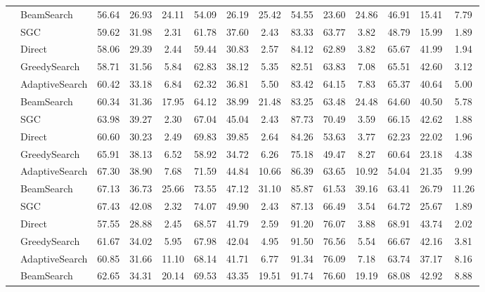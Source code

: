 \documentclass[11pt,UTF8,fontset=fandol]{ctexart}
\begin{document}
\begin{table}[H]
\begin{tabular}{llccc ccc ccc ccc}
& BeamSearch & 56.64 & 26.93 & 24.11 & 54.09 & 26.19 & 25.42 & 54.55 & 23.60 & 24.86 & 46.91 & 15.41 & 7.79\\
& SGC & 59.62 & 31.98 & 2.31 & 61.78 & 37.60 & 2.43 & 83.33 & 63.77 & 3.82 & 48.79 & 15.99 & 1.89\\
\midrule
{}
& Direct & 58.06 & 29.39 & 2.44 & 59.44 & 30.83 & 2.57 & 84.12 & 62.89 & 3.82 & 65.67 & 41.99 & 1.94\\
& GreedySearch & 58.71 & 31.56 & 5.84 & 62.83 & 38.12 & 5.35 & 82.51 & 63.83 & 7.08 & 65.51 & 42.60 & 3.12\\
& AdaptiveSearch & 60.42 & 33.18 & 6.84 & 62.32 & 36.81 & 5.50 & 83.42 & 64.15 & 7.83 & 65.37 & 40.64 & 5.00\\
& BeamSearch & 60.34 & 31.36 & 17.95 & 64.12 & 38.99 & 21.48 & 83.25 & 63.48 & 24.48 & 64.60 & 40.50 & 5.78\\
& SGC & 63.98 & 39.27 & 2.30 & 67.04 & 45.04 & 2.43 & 87.73 & 70.49 & 3.59 & 66.15 & 42.62 & 1.88\\
\midrule
{}
& Direct & 60.60 & 30.23 & 2.49 & 69.83 & 39.85 & 2.64 & 84.26 & 53.63 & 3.77 & 62.23 & 22.02 & 1.96\\
& GreedySearch & 65.91 & 38.13 & 6.52 & 58.92 & 34.72 & 6.26 & 75.18 & 49.47 & 8.27 & 60.64 & 23.18 & 4.38\\
& AdaptiveSearch & 67.30 & 38.90 & 7.68 & 71.59 & 44.84 & 10.66 & 86.39 & 63.65 & 10.92 & 54.04 & 21.35 & 9.99\\
& BeamSearch & 67.13 & 36.73 & 25.66 & 73.55 & 47.12 & 31.10 & 85.87 & 61.53 & 39.16 & 63.41 & 26.79 & 11.26\\
& SGC & 67.43 & 42.08 & 2.32 & 74.07 & 49.90 & 2.43 & 87.13 & 66.49 & 3.54 & 64.72 & 25.67 & 1.89\\
\midrule
{}
& Direct & 57.55 & 28.88 & 2.45 & 68.57 & 41.79 & 2.59 & 91.20 & 76.07 & 3.88 & 68.91 & 43.74 & 2.02\\
& GreedySearch & 61.67 & 34.02 & 5.95 & 67.98 & 42.04 & 4.95 & 91.50 & 76.56 & 5.54 & 66.67 & 42.16 & 3.81\\
& AdaptiveSearch & 60.85 & 31.66 & 11.10 & 68.14 & 41.71 & 6.77 & 91.34 & 76.09 & 7.18 & 63.74 & 37.17 & 8.16\\
& BeamSearch & 62.65 & 34.31 & 20.14 & 69.53 & 43.35 & 19.51 & 91.74 & 76.60 & 19.19 & 68.08 & 42.92 & 8.88\\

\end{tabular}
\end{table}
\end{document}
